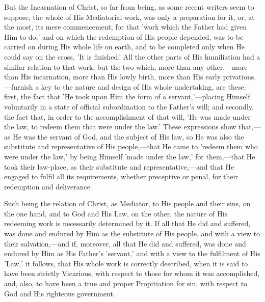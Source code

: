 \documentclass[
]{book}
\begin{document}
But the Incarnation of Christ, so far from being, as some recent writers seem to suppose, the whole of His Mediatorial work, was only a preparation for it, or, at the most, its mere commencement; for that 'work which the Father had given Him to do,' and on which the redemption of His people depended, was to be carried on during His whole life on earth, and to be completed only when He could say on the cross, 'It is finished.' All the other parts of His humiliation had a similar relation to that work; but the two which, more than any other,---more than His incarnation, more than His lowly birth, more than His early privations,---furnish a key to the nature and design of His whole undertaking, are these: first, the fact that 'He took upon Him the form of a servant,'---placing Himself voluntarily in a state of official subordination to the Father's will; and secondly, the fact that, in order to the accomplishment of that will, 'He was made under the law, to redeem them that were under the law.' These expressions show that,---as He was the servant of God, and the subject of His law, so He was also the substitute and representative of His people,---that He came to 'redeem them who were under the law,' by being Himself 'made under the law,' for them,---that He took their law-place, as their substitute and representative,---and that He engaged to fulfil all its requirements, whether preceptive or penal, for their redemption and deliverance.

Such being the relation of Christ, as Mediator, to His people and their sins, on the one hand, and to God and His Law, on the other, the nature of His redeeming work is necessarily determined by it. If all that He did and suffered, was done and endured by Him as the substitute of His people, and with a view to their salvation,---and if, moreover, all that He did and suffered, was done and endured by Him as His Father's 'servant,' and with a view to the fulfilment of His 'Law,' it follows, that His whole work is correctly described, when it is said to have been strictly Vicarious, with respect to those for whom it was accomplished, and, also, to have been a true and proper Propitiation for sin, with respect to God and His righteous government.
\end{document}
